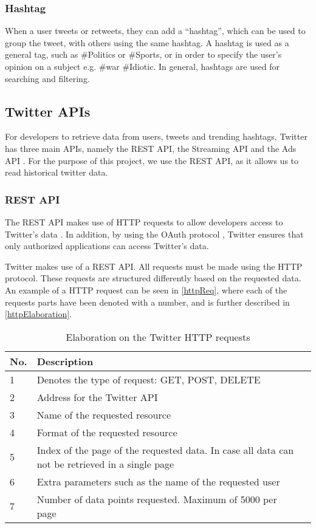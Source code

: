 \subsubsection{Hashtag}
When a user tweets or retweets, they can add a ``hashtag'', which can be used to
group the tweet, with others using the same hashtag. A hashtag is used as a
general tag, such as \#Politics or \#Sports, or in order to specify the user's
opinion on a subject e.g. \#war \#Idiotic. In general, hashtags are used for
searching and filtering.

\subsection{Twitter \acp{API}}
For developers to retrieve data from users, tweets and trending hashtags,
Twitter has three main \acp{API}, namely the \ac{REST} \ac{API}, the Streaming
\ac{API} and the Ads \ac{API} \citep{TwitterDevDocs}. For the purpose of this
project, we use the \ac{REST} \ac{API}, as it allows us to read historical twitter
data.

\subsubsection{REST API}
The \ac{REST} \ac{API} makes use of \ac{HTTP} requests to allow developers access to
Twitter's data \citep{TwitterREST}. In addition, by using the OAuth protocol
\citep{TwitterOAuth}, Twitter ensures that only authorized applications can
access Twitter's data.\nl

Twitter makes use of a \ac{REST} \ac{API}. All requests must be made using the
\ac{HTTP} protocol. These requests are structured differently based on the
requested data. An example of a \ac{HTTP} request can be seen in
\autoref{httpReq}, where each of the requests parts have been denoted with a
number, and is further described in \autoref{httpElaboration}.


\begin{table}[H] 
\begin{centering}
\begin{tabular}{|l|p{9cm}|l|}
\hline
No.			&	Description 		\\\hline
1			&	Denotes the type of request: GET, POST, DELETE 					\\\hline
2			&	Address for the Twitter \ac{API}					\\\hline
3			&	Name of the requested resource	   					\\\hline
4			&	Format of the requested resource					\\\hline
5			&	Index of the page of the requested data. In case all data can not be
retrieved in a single page \\\hline 
6			&	Extra parameters such as the name of the requested user					\\\hline
7			&	Number of data points requested. Maximum of 5000 per page					\\\hline
\end{tabular}
\caption{Elaboration on the Twitter HTTP requests}
\label{httpElaboration}
\end{centering}
\end{table}
